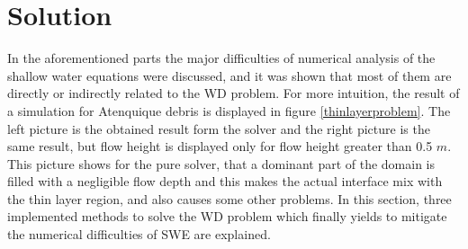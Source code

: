 \documentclass[letterpaper,10pt]{article}
\begin{document}
 

\section{Solution}\label{solution}
In the aforementioned parts the major difficulties of numerical analysis of the shallow water
equations were discussed, and it was shown that most of them are directly or indirectly related to the WD problem.
For more intuition, the result of a simulation for Atenquique debris is displayed in figure \ref{thinlayerproblem}. 
The left picture is the obtained result form the solver and the right picture is the same result, but flow height is displayed 
only for flow height greater than 0.5 $m$. This picture shows for the pure solver, that a dominant part of the 
domain is filled with a negligible flow depth and this makes the actual interface mix with the thin layer region, and 
also causes some other problems. In this section, three implemented methods to solve the WD problem which finally yields to 
mitigate the numerical difficulties of SWE are explained. 
\end{document}
